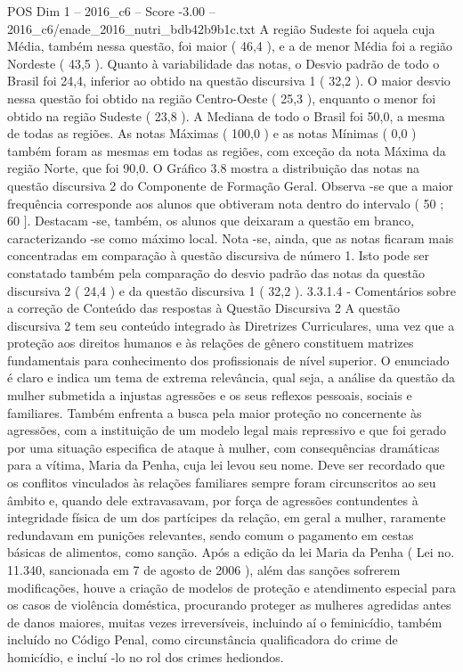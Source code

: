\begin{textsample}{POS Dim 1 – 2016\_c6 – Score -3.00 – 2016\_c6/enade\_2016\_nutri\_bdb42b9b1c.txt}
A região Sudeste foi aquela cuja Média, também nessa questão, foi maior ( 46,4 ), e a de menor Média foi a região Nordeste ( 43,5 ).
Quanto à variabilidade das notas, o Desvio padrão de todo o Brasil foi 24,4, inferior ao obtido na questão discursiva 1 ( 32,2 ).
O maior desvio nessa questão foi obtido na região Centro-Oeste ( 25,3 ), enquanto o menor foi obtido na região Sudeste ( 23,8 ).
A Mediana de todo o Brasil foi 50,0, a mesma de todas as regiões.
As notas Máximas ( 100,0 ) e as notas Mínimas ( 0,0 ) também foram as mesmas em todas as regiões, com exceção da nota Máxima da região Norte, que foi 90,0.
O Gráfico 3.8 mostra a distribuição das notas na questão discursiva 2 do Componente de Formação Geral.
Observa -se que a maior frequência corresponde aos alunos que obtiveram nota dentro do intervalo ( 50 ; 60 ].
Destacam -se, também, os alunos que deixaram a questão em branco, caracterizando -se como máximo local.
Nota -se, ainda, que as notas ficaram mais concentradas em comparação à questão discursiva de número 1.
Isto pode ser constatado também pela comparação do desvio padrão das notas da questão discursiva 2 ( 24,4 ) e da questão discursiva 1 ( 32,2 ). 3.3.1.4 - Comentários sobre a correção de Conteúdo das respostas à Questão Discursiva 2 A questão discursiva 2 tem seu conteúdo integrado às Diretrizes Curriculares, uma vez que a proteção aos direitos humanos e às relações de gênero constituem matrizes fundamentais para conhecimento dos profissionais de nível superior.
O enunciado é claro e indica um tema de extrema relevância, qual seja, a análise da questão da mulher submetida a injustas agressões e os seus reflexos pessoais, sociais e familiares.
Também enfrenta a busca pela maior proteção no concernente às agressões, com a instituição de um modelo legal mais repressivo e que foi gerado por uma situação especifica de ataque à mulher, com consequências dramáticas para a vítima, Maria da Penha, cuja lei levou seu nome.
Deve ser recordado que os conflitos vinculados às relações familiares sempre foram circunscritos ao seu âmbito e, quando dele extravasavam, por força de agressões contundentes à integridade física de um dos partícipes da relação, em geral a mulher, raramente redundavam em punições relevantes, sendo comum o pagamento em cestas básicas de alimentos, como sanção.
Após a edição da lei Maria da Penha ( Lei no. 11.340, sancionada em 7 de agosto de 2006 ), além das sanções sofrerem modificações, houve a criação de modelos de proteção e atendimento especial para os casos de violência doméstica, procurando proteger as mulheres agredidas antes de danos maiores, muitas vezes irreversíveis, incluindo aí o feminicídio, também incluído no Código Penal, como circunstância qualificadora do crime de homicídio, e incluí -lo no rol dos crimes hediondos.

\end{textsample}
